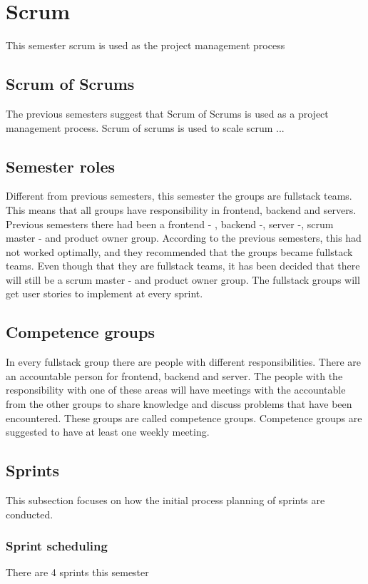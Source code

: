 \section{Scrum}
This semester scrum is used as the project management process

\subsection{Scrum of Scrums}
The previous semesters suggest that Scrum of Scrums is used as a project management process. 
Scrum of scrums is used to scale scrum ...

\subsection{Semester roles}
Different from previous semesters, this semester the groups are fullstack teams. 
This means that all groups have responsibility in frontend, backend and servers.
Previous semesters there had been a frontend - , backend -, server -, scrum master - and product owner group. 
According to the previous semesters, this had not worked optimally, and they recommended that the groups became fullstack teams.
Even though that they are fullstack teams, it has been decided that there will still be a scrum master - and product owner group. 
The fullstack groups will get user stories to implement at every sprint.

\subsection{Competence groups}
In every fullstack group there are people with different responsibilities.
There are an accountable person for frontend, backend and server.
The people with the responsibility with one of these areas will have meetings with the accountable from the other groups to share knowledge and discuss problems that have been encountered.
These groups are called competence groups.
Competence groups are suggested to have at least one weekly meeting.

\subsection{Sprints}
This subsection focuses on how the initial process planning of sprints are conducted. 

\subsubsection{Sprint scheduling}
There are 4 sprints this semester

